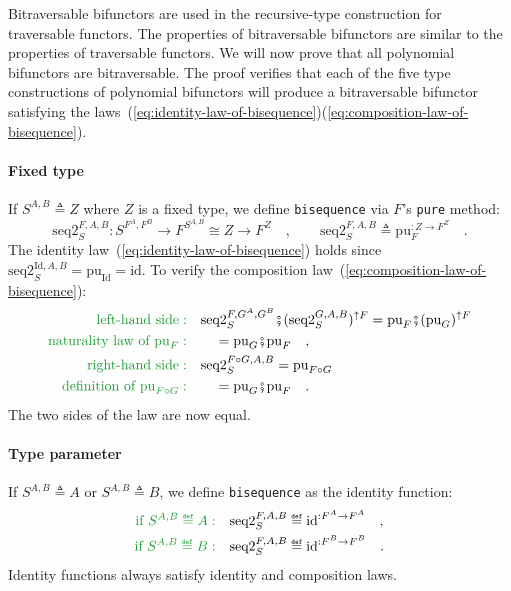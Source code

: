Bitraversable bifunctors are used in the recursive-type construction
for traversable functors. The properties of bitraversable bifunctors
are similar to the properties of traversable functors. We will now
prove that all polynomial bifunctors are bitraversable. The proof
verifies that each of the five type constructions of polynomial bifunctors
will produce a bitraversable bifunctor satisfying the laws~(\ref{eq:identity-law-of-bisequence})\textendash (\ref{eq:composition-law-of-bisequence}).

\paragraph{Fixed type}

If $S^{A,B}\triangleq Z$ where $Z$ is a fixed type, we define \lstinline!bisequence!
via $F$\textsf{'}s \lstinline!pure! method:
\[
\text{seq2}_{S}^{F,A,B}:S^{F^{A},F^{B}}\rightarrow F^{S^{A,B}}\cong Z\rightarrow F^{Z}\quad,\quad\quad\text{seq2}_{S}^{F,A,B}\triangleq\text{pu}_{F}^{:Z\rightarrow F^{Z}}\quad.
\]
The identity law~(\ref{eq:identity-law-of-bisequence}) holds since
$\text{seq2}_{S}^{\text{Id},A,B}=\text{pu}_{\text{Id}}=\text{id}$.
To verify the composition law~(\ref{eq:composition-law-of-bisequence}):
\begin{align*}
{\color{greenunder}\text{left-hand side}:}\quad & \text{seq2}_{S}^{F,G^{A},G^{B}}\bef(\text{seq2}_{S}^{G,A,B})^{\uparrow F}=\text{pu}_{F}\bef(\text{pu}_{G})^{\uparrow F}\\
{\color{greenunder}\text{naturality law of }\text{pu}_{F}:}\quad & \quad=\text{pu}_{G}\bef\text{pu}_{F}\quad,\\
{\color{greenunder}\text{right-hand side}:}\quad & \text{seq2}_{S}^{F\circ G,A,B}=\text{pu}_{F\circ G}\\
{\color{greenunder}\text{definition of }\text{pu}_{F\circ G}:}\quad & \quad=\text{pu}_{G}\bef\text{pu}_{F}\quad.
\end{align*}
The two sides of the law are now equal.

\paragraph{Type parameter}

If $S^{A,B}\triangleq A$ or $S^{A,B}\triangleq B$, we define \lstinline!bisequence!
as the identity function:
\begin{align*}
{\color{greenunder}\text{if }S^{A,B}\triangleq A:}\quad & \text{seq2}_{S}^{F,A,B}\triangleq\text{id}^{:F^{A}\rightarrow F^{A}}\quad,\\
{\color{greenunder}\text{if }S^{A,B}\triangleq B:}\quad & \text{seq2}_{S}^{F,A,B}\triangleq\text{id}^{:F^{B}\rightarrow F^{B}}\quad.
\end{align*}
Identity functions always satisfy identity and composition laws.

